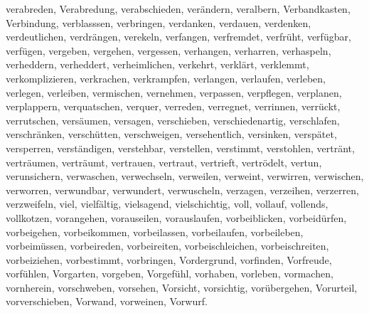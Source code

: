 \documentclass[a4paper,10pt,fleqn,twocolumn,twoside,dvipdfmx]{scrartcl}
\begin{document}
verabreden,
Verabredung,
verabschieden,
verändern,
veralbern,
Verbandkasten,
Verbindung,
verblasssen,
verbringen,
verdanken,
verdauen,
verdenken,
verdeutlichen,
verdrängen,
verekeln,
verfangen,
verfremdet,
verfrüht,
verfügbar,
verfügen,
vergeben,
vergehen,
vergessen,
verhangen,
verharren,
verhaspeln,
verheddern,
verheddert,
verheimlichen,
verkehrt,
verklärt,
verklemmt,
verkomplizieren,
verkrachen,
verkrampfen,
verlangen,
verlaufen,
verleben,
verlegen,
verleiben,
vermischen,
vernehmen,
verpassen,
verpflegen,
verplanen,
verplappern,
verquatschen,
verquer,
verreden,
verregnet,
verrinnen,
verrückt,
verrutschen,
versäumen,
versagen,
verschieben,
verschiedenartig,
verschlafen,
verschränken,
verschütten,
verschweigen,
versehentlich,
versinken,
verspätet,
versperren,
verständigen,
verstehbar,
verstellen,
verstimmt,
verstohlen,
vertränt,
verträumen,
verträumt,
vertrauen,
vertraut,
vertrieft,
vertrödelt,
vertun,
verunsichern,
verwaschen,
verwechseln,
verweilen,
verweint,
verwirren,
verwischen,
verworren,
verwundbar,
verwundert,
verwuscheln,
verzagen,
verzeihen,
verzerren,
verzweifeln,
viel,
vielfältig,
vielsagend,
vielschichtig,
voll,
vollauf,
vollends,
vollkotzen,
vorangehen,
vorauseilen,
vorauslaufen,
vorbeiblicken,
vorbeidürfen,
vorbeigehen,
vorbeikommen,
vorbeilassen,
vorbeilaufen,
vorbeileben,
vorbeimüssen,
vorbeireden,
vorbeireiten,
vorbeischleichen,
vorbeischreiten,
vorbeiziehen,
vorbestimmt,
vorbringen,
Vordergrund,
vorfinden,
Vorfreude,
vorfühlen,
Vorgarten,
vorgeben,
Vorgefühl,
vorhaben,
vorleben,
vormachen,
vornherein,
vorschweben,
vorsehen,
Vorsicht,
vorsichtig,
vorübergehen,
Vorurteil,
vorverschieben,
Vorwand,
vorweinen,
Vorwurf.
\end{document}

